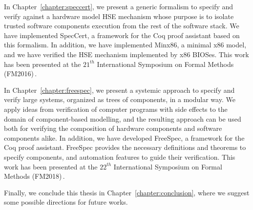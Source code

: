 In Chapter~\ref{chapter:speccert}, we present a generic formalism to specify and
verify against a hardware model HSE mechanism whose purpose is to isolate
trusted software components execution from the rest of the software stack.
%
We have implemented SpecCert, a framework for the Coq proof assistant based on
this formalism. In addition, we have implemented {\sc Minx86}, a minimal x86
model, and we have verified the HSE mechanism implemented by x86 BIOSes.
%
This work has been presented at the $21^{th}$ International Symposium on Formal
Methods (FM2016)\,\cite{letan2016speccert}.

In Chapter~\ref{chapter:freespec}, we present a systemic approach to specify and
verify large systems, organized as trees of components, in a modular way.
%
We apply ideas from verification of computer programs with side effects to the
domain of component-based modelling, and the resulting approach can be used both
for verifying the composition of hardware components and software components
alike.
%
In addition, we have developed FreeSpec, a framework for the Coq proof
assistant.
%
FreeSpec provides the necessary definitions and theorems to specify components,
and automation features to guide their verification.
%
This work has been presented at the $22^{th}$ International Symposium on Formal
Methods (FM2018)\,\cite{letan2018freespec}.

Finally, we conclude this thesis in Chapter~\ref{chapter:conclusion}, where we
suggest some possible directions for future works.
